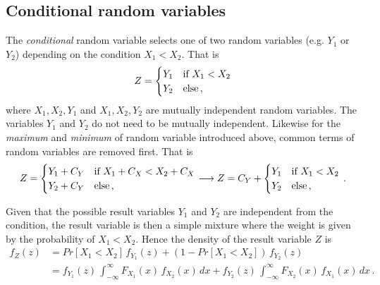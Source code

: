 \subsection{Conditional random variables}
The \emph{conditional} random variable selects one of two random variables (e.g. $Y_1$ or $Y_2$) depending
on the condition $X_1 < X_2$. That is 
\begin{equation}
 Z = \begin{cases}
   Y_1 & \mbox{if } X_1 < X_2\\
   Y_2 & \mbox{else\,,} 
 \end{cases} \nonumber
\end{equation}
where $X_1, X_2, Y_1$ and $X_1, X_2, Y_2$ are mutually independent random variables. The variables
$Y_1$ and $Y_2$ do not need to be mutually independent. Likewise for the \emph{maximum} and 
\emph{minimum} of random variable introduced above, common terms of random variables are 
removed first. That is
\begin{equation}
 Z = \begin{cases}
   Y_1+C_Y & \mbox{if } X_1+C_X < X_2+C_X\\
   Y_2+C_Y & \mbox{else\,,} 
 \end{cases} \longrightarrow
 Z = C_Y + \begin{cases}
   Y_1 & \mbox{if } X_1 < X_2\\
   Y_2 & \mbox{else\,,} 
 \end{cases}\,.\nonumber
\end{equation}

Given that the possible result variables $Y_1$
and $Y_2$ are independent from the condition, the result variable is then a simple mixture where the weight
is given by the probability of $X_1<X_2$. Hence the density of the result variable $Z$ is
\begin{align}
 f_Z(z) &= Pr[X_1<X_2]\,f_{Y_1}(z) + \left(1-Pr[X_1<X_2]\right)\,f_{Y_2}(z) \nonumber \\
    &= f_{Y_1}(z)\,\int_{-\infty}^{\infty}F_{X_1}(x)\,f_{X_2}(x)\,dx + 
    f_{Y_2}(z)\,\int_{-\infty}^{\infty}F_{X_2}(x)\,f_{X_1}(x)\,dx\,.\nonumber
\end{align}


